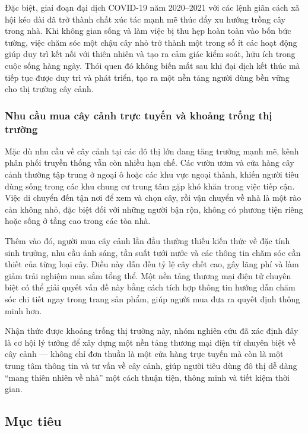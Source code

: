 \documentclass[11pt, a4paper]{article}
\begin{document}
Đặc biệt, giai đoạn đại dịch COVID-19 năm 2020--2021 với các lệnh giãn cách xã hội kéo dài đã trở thành chất xúc tác mạnh mẽ thúc đẩy xu hướng trồng cây trong nhà. Khi không gian sống và làm việc bị thu hẹp hoàn toàn vào bốn bức tường, việc chăm sóc một chậu cây nhỏ trở thành một trong số ít các hoạt động giúp duy trì kết nối với thiên nhiên và tạo ra cảm giác kiểm soát, hữu ích trong cuộc sống hàng ngày. Thói quen đó không biến mất sau khi đại dịch kết thúc mà tiếp tục được duy trì và phát triển, tạo ra một nền tảng người dùng bền vững cho thị trường cây cảnh.

\subsubsection{Nhu cầu mua cây cảnh trực tuyến và khoảng trống thị trường}

Mặc dù nhu cầu về cây cảnh tại các đô thị lớn đang tăng trưởng mạnh mẽ, kênh phân phối truyền thống vẫn còn nhiều hạn chế. Các vườn ươm và cửa hàng cây cảnh thường tập trung ở ngoại ô hoặc các khu vực ngoại thành, khiến người tiêu dùng sống trong các khu chung cư trung tâm gặp khó khăn trong việc tiếp cận. Việc di chuyển đến tận nơi để xem và chọn cây, rồi vận chuyển về nhà là một rào cản không nhỏ, đặc biệt đối với những người bận rộn, không có phương tiện riêng hoặc sống ở tầng cao trong các tòa nhà.

Thêm vào đó, người mua cây cảnh lần đầu thường thiếu kiến thức về đặc tính sinh trưởng, nhu cầu ánh sáng, tần suất tưới nước và các thông tin chăm sóc cần thiết của từng loại cây. Điều này dẫn đến tỷ lệ cây chết cao, gây lãng phí và làm giảm trải nghiệm mua sắm tổng thể. Một nền tảng thương mại điện tử chuyên biệt có thể giải quyết vấn đề này bằng cách tích hợp thông tin hướng dẫn chăm sóc chi tiết ngay trong trang sản phẩm, giúp người mua đưa ra quyết định thông minh hơn.

Nhận thức được khoảng trống thị trường này, nhóm nghiên cứu đã xác định đây là cơ hội lý tưởng để xây dựng một nền tảng thương mại điện tử chuyên biệt về cây cảnh --- không chỉ đơn thuần là một cửa hàng trực tuyến mà còn là một trung tâm thông tin và tư vấn về cây cảnh, giúp người tiêu dùng đô thị dễ dàng ``mang thiên nhiên về nhà'' một cách thuận tiện, thông minh và tiết kiệm thời gian.

\subsection{Mục tiêu}
\end{document}

